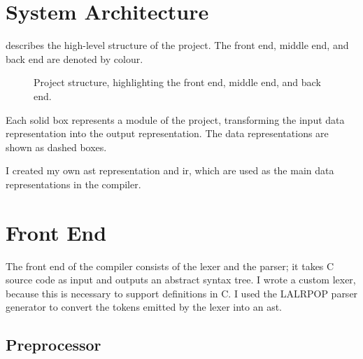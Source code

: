 \documentclass[00-main.tex]{subfiles}
\begin{document}
\section{System Architecture}

 describes the high-level structure of the project. The \textcolor{frontendcolor}{front end}, \textcolor{middleendcolor}{middle end}, and \textcolor{backendcolor}{back end} are denoted by colour.

\begin{figure}[!ht]
  \centering
  \caption{Project structure, highlighting the \textcolor{frontendcolor}{front end}, \textcolor{middleendcolor}{middle end}, and \textcolor{backendcolor}{back end}.}
  \label{fig:project flowchart}
\end{figure}

Each solid box represents a module of the project, transforming the input data representation into the output representation.
The data representations are shown as dashed boxes.

I created my own \gls{ast} representation and \gls{ir}, which are used as the main data representations in the compiler.


\section{Front End}


The front end of the compiler consists of the lexer and the parser; it takes C source code as input and outputs an abstract syntax tree.
I wrote a custom lexer, because this is necessary to support  definitions in C\@.
I used the LALRPOP parser generator  to convert the tokens emitted by the lexer into an \gls{ast}\@.

\subsection{Preprocessor}
\end{document}
